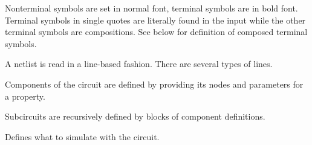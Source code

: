Nonterminal symbols are set in normal font, terminal symbols are in
bold font. Terminal symbols in single quotes are literally found in
the input while the other terminal symbols are compositions. See below
for definition of composed terminal symbols.


%
%
\begin{grammar}


\end{grammar}

A netlist is read in a line-based fashion. There are several types of
lines.


%
\begin{grammar}

\end{grammar}

Components of the circuit are defined by providing its nodes and
parameters for a property.

%
\begin{grammar}




\end{grammar}

Subcircuits are recursively defined by blocks of component
definitions.

%
\begin{grammar}

\end{grammar}

Defines what to simulate with the circuit.

%
\begin{grammar}

\end{grammar}

